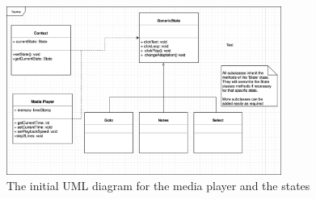 \begin{figure}
\begin{center}
\includegraphics[width=9cm]{figures/uml_diagram}
\end{center}
\caption{The initial UML diagram for the media player and the states}
\label{fig:uml}
\end{figure}